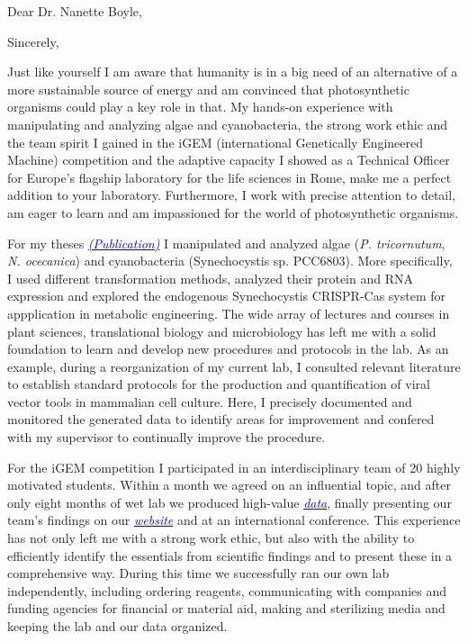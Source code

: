 \documentclass[11pt,a4paper,sans]{moderncv}
\begin{document}
\thispagestyle{titlepage}
\date{\today}
\opening{Dear Dr. Nanette Boyle,}
\closing{Sincerely,}
\makelettertitle
\begin{spacing}{1.1}
Just like yourself I am aware that humanity is in a big need of an alternative of a more sustainable source of energy and am convinced that photosynthetic organisms could play a key role in that. 
My hands-on experience with manipulating and analyzing algae and cyanobacteria, the strong work ethic and the team spirit I gained in the iGEM (international Genetically Engineered Machine) competition and the adaptive capacity I showed as a Technical Officer for Europe's flagship laboratory for the life sciences in Rome, make me a perfect addition to your laboratory. Furthermore, I work with precise attention to detail, am eager to learn and am impassioned for the world of photosynthetic organisms.
\par%
For my theses {\href{https://www.ncbi.nlm.nih.gov/pubmed/29517395}{\textcolor{blue}{{\textit{(Publication)}}}}} I manipulated and analyzed algae (\textit{P. tricornutum}, \textit{N. ocecanica}) and cyanobacteria (Synechocystis sp. PCC6803). 
More specifically, I used different transformation methods, analyzed their protein and RNA expression and explored the endogenous Synechocystis CRISPR-Cas system for appplication in metabolic engineering. 
The wide array of lectures and courses in plant sciences, translational biology and microbiology has left me with a solid foundation to learn and
develop new procedures and protocols in the lab.
As an example, during a reorganization of my current lab, I consulted relevant literature to establish standard protocols for the production and quantification of viral vector tools in mammalian cell culture.
Here, I precisely documented and monitored the generated data to identify areas for improvement and confered with my supervisor to continually improve the procedure. \par%
For the iGEM competition I participated in an interdisciplinary team of 20 highly motivated students.
Within a month we agreed on an influential topic, and after only eight months of wet lab we produced high-value  {\href{https://www.ncbi.nlm.nih.gov/pubmed/29803867}{\textcolor{blue}{\textit{data}}}}, finally presenting our team's findings on our {\href{http://2015.igem.org/Team:Freiburg}{\textcolor{blue}{\textit{website}}}} and at an international conference. 
This experience has not only left me with a strong work ethic, but also with the ability to efficiently identify the essentials from scientific findings and to present these in a comprehensive way. 
During this time we successfully ran our own lab independently, including ordering reagents, communicating with companies and funding agencies for financial or material aid, making and sterilizing media and keeping the lab and our data organized. \par 


\end{spacing}
\end{document}
